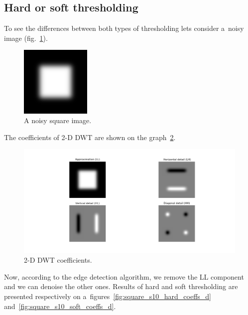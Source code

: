 \subsection{Hard or soft thresholding}

To see the differences between both types of thresholding lets consider a~noisy image (fig.~\ref{fig:square_s10}).

\begin{figure}[h]
	\centering
	\includegraphics[width=0.3\textwidth]{graphs/square_s10.png}
	\caption{A noisy square image.}
	\label{fig:square_s10}
\end{figure}

The coefficients of 2-D DWT are shown on the graph~\ref{fig:square_s10_coeffs}.

\begin{figure}[h]
	\centering
	\includegraphics[width=\textwidth]{graphs/square_s10_db1_coeffs.png}
	\caption{2-D DWT coefficients.}
	\label{fig:square_s10_coeffs}
\end{figure}

Now, according to the edge detection algorithm, we remove the LL component and we can denoise the other ones. Results of hard and soft thresholding are presented respectively on a~figures~\ref{fig:square_s10_hard_coeffs_d} and~\ref{fig:square_s10_soft_coeffs_d}.

